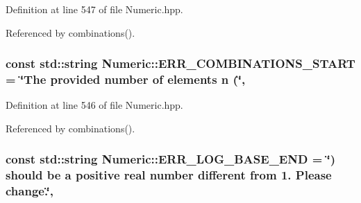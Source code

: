 Definition at line 547 of file Numeric.\-hpp.



Referenced by combinations().

\hypertarget{classmultiscale_1_1Numeric_a0de8a663c81ef3b50fba84645eab6e7d}{
\subsubsection[{E\-R\-R\-\_\-\-C\-O\-M\-B\-I\-N\-A\-T\-I\-O\-N\-S\-\_\-\-S\-T\-A\-R\-T}]{\setlength{\rightskip}{0pt plus 5cm}const std\-::string Numeric\-::\-E\-R\-R\-\_\-\-C\-O\-M\-B\-I\-N\-A\-T\-I\-O\-N\-S\-\_\-\-S\-T\-A\-R\-T = \char`\"{}The provided number of elements n (\char`\"{}\hspace{0.3cm}{\ttfamily [static]}, {\ttfamily [private]}}}\label{classmultiscale_1_1Numeric_a0de8a663c81ef3b50fba84645eab6e7d}


Definition at line 546 of file Numeric.\-hpp.



Referenced by combinations().

\hypertarget{classmultiscale_1_1Numeric_a291c98ea0c6e6c4042fe9ecc4af0443a}{
\subsubsection[{E\-R\-R\-\_\-\-L\-O\-G\-\_\-\-B\-A\-S\-E\-\_\-\-E\-N\-D}]{\setlength{\rightskip}{0pt plus 5cm}const std\-::string Numeric\-::\-E\-R\-R\-\_\-\-L\-O\-G\-\_\-\-B\-A\-S\-E\-\_\-\-E\-N\-D = \char`\"{}) should be a positive real number different from 1. Please change.\char`\"{}\hspace{0.3cm}{\ttfamily [static]}, {\ttfamily [private]}}}\label{classmultiscale_1_1Numeric_a291c98ea0c6e6c4042fe9ecc4af0443a}


